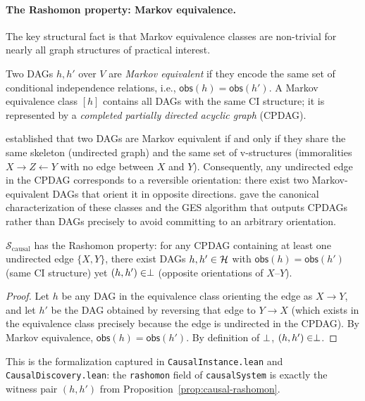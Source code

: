 \paragraph{The Rashomon property: Markov equivalence.}
The key structural fact is that Markov equivalence classes are non-trivial
for nearly all graph structures of practical interest.

\begin{definition}
\label{def:markov-equiv}
Two DAGs $h, h'$ over $V$ are \emph{Markov equivalent} if they encode
the same set of conditional independence relations, i.e.,
$\mathsf{obs}(h) = \mathsf{obs}(h')$.  A Markov equivalence class
$[h]$ contains all DAGs with the same CI structure; it is represented
by a \emph{completed partially directed acyclic graph} (CPDAG).
\end{definition}

\citet{verma1991equivalence} established that two DAGs are Markov equivalent
if and only if they share the same skeleton (undirected graph) and the same
set of v-structures (immoralities $X \to Z \leftarrow Y$ with no edge between
$X$ and $Y$).  Consequently, any undirected edge in the CPDAG corresponds to
a reversible orientation: there exist two Markov-equivalent DAGs that orient
it in opposite directions.  \citet{chickering2002optimal} gave the canonical
characterization of these classes and the GES algorithm that outputs CPDAGs
rather than DAGs precisely to avoid committing to an arbitrary orientation.

\begin{proposition}
\label{prop:causal-rashomon}
$\mathcal{S}_{\mathrm{causal}}$ has the Rashomon property: for any CPDAG
containing at least one undirected edge $\{X, Y\}$, there exist DAGs
$h, h' \in \mathcal{H}$ with $\mathsf{obs}(h) = \mathsf{obs}(h')$ (same CI
structure) yet $(h, h') \in \perp$ (opposite orientations of $X$--$Y$).
\end{proposition}

\begin{proof}
Let $h$ be any DAG in the equivalence class orienting the edge as $X \to Y$,
and let $h'$ be the DAG obtained by reversing that edge to $Y \to X$ (which
exists in the equivalence class precisely because the edge is undirected in
the CPDAG).  By Markov equivalence, $\mathsf{obs}(h) = \mathsf{obs}(h')$.
By definition of $\perp$, $(h, h') \in \perp$.
\end{proof}

This is the formalization captured in \texttt{CausalInstance.lean} and
\texttt{CausalDiscovery.lean}: the \texttt{rashomon} field of
\texttt{causalSystem} is exactly the witness pair $(h, h')$ from
Proposition~\ref{prop:causal-rashomon}.


